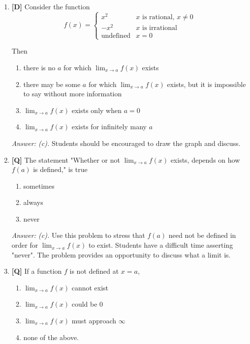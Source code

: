 \documentclass[12pt]{article}
\begin{document}
\begin{enumerate}
\bigskip

\item {\bf [D]} Consider the function
\[f(x)=\left\{\begin{array}{ll}
             x^2 & \mbox{$x$ is rational, $x\neq 0$} \\
             -x^2 & \mbox{$x$ is irrational} \\
	     \mbox{undefined} & x=0 
		\end{array}\right.\]

Then
\begin{enumerate}
\item there is no $a$ for which $\displaystyle{\lim_{x\rightarrow a}f(x)}$
exists
\item there may be some $a$ for which
$\displaystyle{\lim_{x\rightarrow a}f(x)}$ exists, but it is impossible
to say without more information
\item $\displaystyle{\lim_{x\rightarrow a}f(x)}$ exists only when $a=0$
\item $\displaystyle{\lim_{x\rightarrow a}f(x)}$ exists for infinitely
many $a$
\end{enumerate}

{\it Answer: (c).} Students should be encouraged to draw the graph
and discuss.

\bigskip

\item {\bf [Q]} The statement "Whether or not $\displaystyle{\lim_{x\rightarrow a}f(x)}$ exists,
depends on how $f(a)$ is defined," is true
\begin{enumerate}
\item sometimes
\item always
\item never
\end{enumerate}

{\it Answer: (c).} Use this problem to stress that $f(a)$ need not be defined in order for $\displaystyle{\lim_{x\rightarrow a}f(x)}$ to exist. Students have a difficult time asserting "never". The problem provides an opportunity to discuss what a limit is.

\bigskip

\item {\bf [Q]} If a function $f$ is not defined at $x=a$,
\begin{enumerate}
\item $\displaystyle{\lim_{x\rightarrow a} f(x)}$ cannot exist
\item $\displaystyle{\lim_{x\rightarrow a} f(x)}$ could be $0$
\item $\displaystyle{\lim_{x\rightarrow a} f(x)}$ must approach $\infty$
\item none of the above.
\end{enumerate} 


\end{enumerate}
\end{document}
